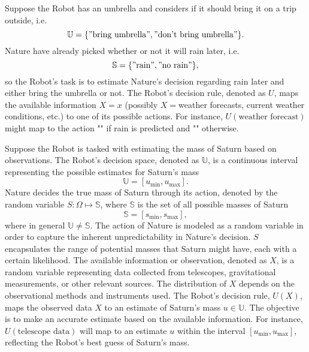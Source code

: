 	\begin{example}
		\label{ex:rain}
		Suppose the Robot has an umbrella and considers if it should bring it on a trip outside, i.e.
		\begin{equation}
			\mathbb{U} = \{"\text{bring umbrella}", "\text{don't bring umbrella}"\}.
		\end{equation}
		Nature have already picked whether or not it will rain later, i.e.
		\begin{equation}
			\mathbb{S} = \{"\text{rain}", "\text{no rain}"\},
		\end{equation}
		so the Robot's task is to estimate Nature's decision regarding rain later and either bring the umbrella or not. The Robot's decision rule, denoted as $U$, maps the available information $X=x$ (possibly $X=$weather forecasts, current weather conditions, etc.) to one of its possible actions. For instance, $U(\text{weather forecast})$ might map to the action "" if rain is predicted and "" otherwise.
	\end{example}
	\begin{example}
		\label{ex:saturn_mass}
		Suppose the Robot is tasked with estimating the mass of Saturn based on observations. The Robot's decision space, denoted as $\mathbb{U}$, is a continuous interval representing the possible estimates for Saturn's mass
		\begin{equation}
			\mathbb{U} = [u_{\text{min}}, u_{\text{max}}].
		\end{equation}
		Nature decides the true mass of Saturn through its action, denoted by the random variable $S:\Omega \mapsto \mathbb{S}$, where $\mathbb{S}$ is the set of all possible masses of Saturn
		\begin{equation}
			\mathbb{S} = [s_{\text{min}}, s_{\text{max}}],
		\end{equation}
		where in general $\mathbb{U}\neq\mathbb{S}$. The action of Nature is modeled as a random variable in order to capture the inherent unpredictability in Nature's decision. $S$ encapsulates the range of potential masses that Saturn might have, each with a certain likelihood. The available information or observation, denoted as $X$, is a random variable representing data collected from telescopes, gravitational measurements, or other relevant sources. The distribution of $X$ depends on the observational methods and instruments used. The Robot's decision rule, $U(X)$, maps the observed data $X$ to an estimate of Saturn's mass $u \in \mathbb{U}$. The objective is to make an accurate estimate based on the available information.  For instance, $U(\text{telescope data})$ will map to an estimate $u$ within the interval $[u_{\text{min}}, u_{\text{max}}]$, reflecting the Robot's best guess of Saturn's mass.
	\end{example}
	
